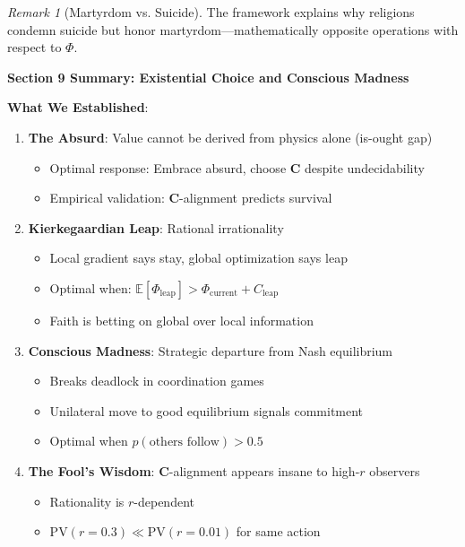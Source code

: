 \documentclass[11pt,a4paper]{article}
\theoremstyle{definition}
\theoremstyle{remark}
\newtheorem{remark}{Remark}[section]
\begin{document}
\begin{small}
\begin{enumerate}
\begin{remark}[Martyrdom vs. Suicide]
The framework explains why religions condemn suicide but honor martyrdom—mathematically opposite operations with respect to \(\Phi\).
\end{remark}

\begin{mdframed}[backgroundcolor=green!10,linewidth=2pt,linecolor=green!70!black]
\textbf{Section 9 Summary: Existential Choice and Conscious Madness}

\textbf{What We Established}:
\begin{enumerate}[nosep]
    \item \textbf{The Absurd}: Value cannot be derived from physics alone (is-ought gap)
        \begin{itemize}[nosep]
            \item Optimal response: Embrace absurd, choose \(\mathbf{C}\) despite undecidability
            \item Empirical validation: \(\mathbf{C}\)-alignment predicts survival
        \end{itemize}
    \item \textbf{Kierkegaardian Leap}: Rational irrationality
        \begin{itemize}[nosep]
            \item Local gradient says stay, global optimization says leap
            \item Optimal when: \(\mathbb{E}[\Phi_{\text{leap}}] > \Phi_{\text{current}} + C_{\text{leap}}\)
            \item Faith is betting on global over local information
        \end{itemize}
    \item \textbf{Conscious Madness}: Strategic departure from Nash equilibrium
        \begin{itemize}[nosep]
            \item Breaks deadlock in coordination games
            \item Unilateral move to good equilibrium signals commitment
            \item Optimal when \(p(\text{others follow}) > 0.5\)
        \end{itemize}
    \item \textbf{The Fool's Wisdom}: \(\mathbf{C}\)-alignment appears insane to high-\(r\) observers
        \begin{itemize}[nosep]
            \item Rationality is \(r\)-dependent
            \item \(\text{PV}(r=0.3) \ll \text{PV}(r=0.01)\) for same action

\end{itemize}
\end{enumerate}
\end{mdframed}
\end{enumerate}
\end{small}
\end{document}
